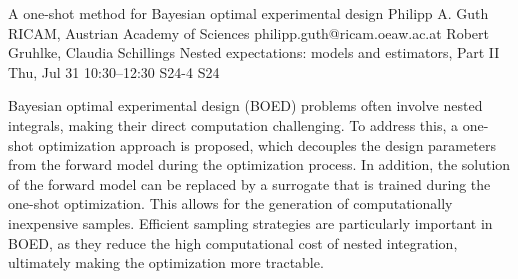 \begin{talk}
  {A one-shot method for Bayesian optimal experimental design}%
  {Philipp A. Guth}%
  {RICAM, Austrian Academy of Sciences}%
  {philipp.guth@ricam.oeaw.ac.at}%
  {Robert Gruhlke, Claudia Schillings}%
  {Nested expectations: models and estimators, Part II}%
  {Thu, Jul 31 10:30–12:30}%
  {S24-4}%
  {S24}%
				
		
Bayesian optimal experimental design (BOED) problems often involve nested integrals, making their direct computation challenging. To address this, a one-shot optimization approach is proposed, which decouples the design parameters from the forward model during the optimization process. In addition, the solution of the forward model can be replaced by a surrogate that is trained during the one-shot optimization. This allows for the generation of computationally inexpensive samples. Efficient sampling strategies are particularly important in BOED, as they reduce the high computational cost of nested integration, ultimately making the optimization more tractable.



%
%
\end{talk}

